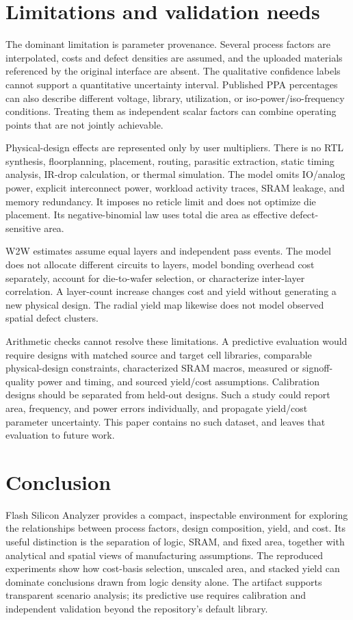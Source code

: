 \documentclass[11pt,a4paper]{article}
\newcommand{\tool}{Flash Silicon Analyzer}
\begin{document}
\section{Limitations and validation needs}
The dominant limitation is parameter provenance. Several process factors
are interpolated, costs and defect densities are assumed, and the uploaded
materials referenced by the original interface are absent. The qualitative
confidence labels cannot support a quantitative uncertainty interval.
Published PPA percentages can also describe different voltage, library,
utilization, or iso-power/iso-frequency conditions. Treating them as
independent scalar factors can combine operating points that are not jointly
achievable.

Physical-design effects are represented only by user multipliers. There is
no RTL synthesis, floorplanning, placement, routing, parasitic extraction,
static timing analysis, IR-drop calculation, or thermal simulation.
The model omits IO/analog power, explicit interconnect power, workload
activity traces, SRAM leakage, and memory redundancy. It imposes no reticle
limit and does not optimize die placement. Its negative-binomial law uses
total die area as effective defect-sensitive area.

W2W estimates assume equal layers and independent pass events. The model
does not allocate different circuits to layers, model bonding overhead
cost separately, account for die-to-wafer selection, or characterize
inter-layer correlation. A layer-count increase changes cost and yield
without generating a new physical design. The radial yield map likewise
does not model observed spatial defect clusters.

Arithmetic checks cannot resolve these limitations. A predictive evaluation
would require designs with matched source and target cell libraries,
comparable physical-design constraints, characterized SRAM macros,
measured or signoff-quality power and timing, and sourced yield/cost
assumptions. Calibration designs should be separated from held-out designs.
Such a study could report area, frequency, and power errors individually,
and propagate yield/cost parameter uncertainty. This paper contains no such
dataset, and leaves that evaluation to future work.

\section{Conclusion}
\tool{} provides a compact, inspectable environment for exploring
the relationships between process factors, design composition, yield, and
cost. Its useful distinction is the separation of logic, SRAM, and fixed
area, together with analytical and spatial views of manufacturing
assumptions. The reproduced experiments show how cost-basis selection,
unscaled area, and stacked yield can dominate conclusions drawn from logic
density alone. The artifact supports transparent scenario analysis; its
predictive use requires calibration and independent validation beyond the
repository's default library.
\end{document}
